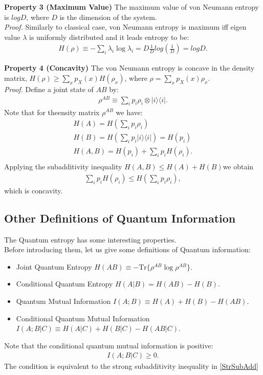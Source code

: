 \textbf{Property 3 (Maximum Value)}
The maximum value of von Neumann entropy is $logD$, where $D$ is the dimension of the system. \\
\textit{Proof.} Similarly to classical case, von Neumann entropy is maximum iff eigen value $\lambda$ is uniformly distributed and it leads entropy to be:
\begin{align*}
H(\rho) \equiv -\sum_{i} \lambda_i \log \lambda_i = D\frac{1}{D} log(\frac{1}{D})=logD.
\end{align*}

\textbf{Property 4 (Concavity)}
The von Neumann entropy is concave in the density matrix, $H(\rho) \geq \sum_x p_X(x) H(\rho_x)$, where $\rho = \sum_x p_X(x)\rho_x$. \\
\textit{Proof.} Define a joint state of $AB$ by:
\begin{align*}
\rho^{AB} \equiv \sum_i p_i \rho_i \otimes |i\rangle \langle i|.
\end{align*}
Note that for theensity matrix $\rho^{AB}$ we have:
\begin{align*}
H(A)=H(\sum_i p_i \rho_i) \\
H(B)=H(\sum_i p_i |i \rangle \langle i|)=H(p_i) \\
H(A,B)=H(p_i)+\sum_i p_i H(\rho_i). \\
\end{align*}
Applying the subadditivity inequality $H(A,B) \leq H(A)+H(B)$we obtain
\begin{align*}
\sum_i p_i H(\rho_i) \leq H(\sum_i p_i \rho_i),
\end{align*}
which is concavity.

\subsection{Other Definitions of Quantum Information}
The Quantum entropy has some interesting properties. \\
Before introducing them, let us give some definitions of Quantum information: \\
\begin{itemize}
	\item {\color{red}Joint Quantum Entropy} $H(AB) \equiv -\text{Tr}\{\rho^{AB} \log \rho^{AB}\}$.
	\item {\color{red}Conditional Quantum Entropy} $H(A|B) = H(AB) - H(B)$.
	\item {\color{red}Quantum Mutual Information} $I(A;B) \equiv H(A)+H(B)-H(AB)$.
	\item {\color{red}Conditional Quantum Mutual Information} $I(A;B|C) \equiv H(A|C)+H(B|C)-H(AB|C)$.
\end{itemize}
Note that the conditional quantum mutual information is positive:
\begin{align*}
I(A;B|C) \geq 0.
\end{align*}
The condition is equivalent to the strong subadditivity inequality in \ref{StrSubAdd}

